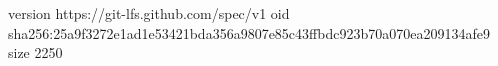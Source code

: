 version https://git-lfs.github.com/spec/v1
oid sha256:25a9f3272e1ad1e53421bda356a9807e85c43ffbdc923b70a070ea209134afe9
size 2250
